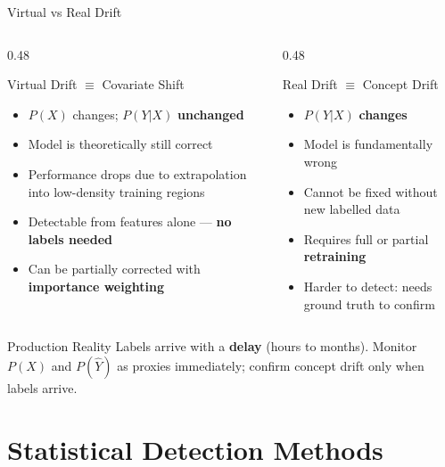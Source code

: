 \documentclass[10pt,aspectratio=169]{beamer}
\begin{document}
\begin{frame}{Virtual vs Real Drift}
  \begin{columns}[T]
    \begin{column}{0.48\textwidth}
      \begin{block}{Virtual Drift $\equiv$ Covariate Shift}
        \begin{itemize}
          \item $P(X)$ changes;\; $P(Y|X)$ \textbf{unchanged}
          \item Model is theoretically still correct
          \item Performance drops due to extrapolation into low-density training regions
          \item Detectable from features alone --- \textbf{no labels needed}
          \item Can be partially corrected with \textbf{importance weighting}
        \end{itemize}
      \end{block}
    \end{column}
    \begin{column}{0.48\textwidth}
      \begin{alertblock}{Real Drift $\equiv$ Concept Drift}
        \begin{itemize}
          \item $P(Y|X)$ \textbf{changes}
          \item Model is fundamentally wrong
          \item Cannot be fixed without new labelled data
          \item Requires full or partial \textbf{retraining}
          \item Harder to detect: needs ground truth to confirm
        \end{itemize}
      \end{alertblock}
    \end{column}
  \end{columns}
  \vspace{0.3cm}
  \begin{block}{Production Reality}
    Labels arrive with a \textbf{delay} (hours to months). Monitor $P(X)$ and $P(\hat{Y})$ as proxies immediately; confirm concept drift only when labels arrive.
  \end{block}
\end{frame}

\section{Statistical Detection Methods}
\end{document}
